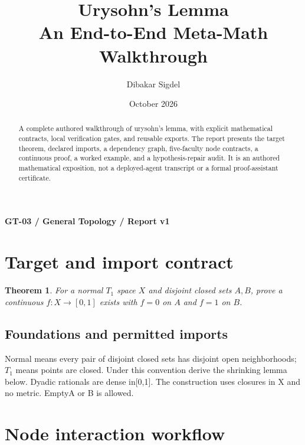 \documentclass[preprint,12pt,aps,pra,showkeys,amsmath,amssymb,superscriptaddress,floatfix]{revtex4-2}
\newtheorem{theorem}{Theorem}[section]
\theoremstyle{definition}
\theoremstyle{remark}
\begin{document}
\title{Urysohn's Lemma\\[4pt]\large An End-to-End Meta-Math Walkthrough}

\author{Dibakar Sigdel}


\date{October 2026}

\begin{abstract}

A complete authored walkthrough of urysohn's lemma, with explicit
mathematical contracts, local verification gates, and reusable exports.
The report presents the target theorem, declared imports, a dependency
graph, five-faculty node contracts, a continuous proof, a worked
example, and a hypothesis-repair audit. It is an authored mathematical
exposition, not a deployed-agent transcript or a formal proof-assistant
certificate.

\end{abstract}\maketitle\linespread{1.12}\selectfont

\noindent\textbf{GT-03 / General Topology / Report v1}

\section{Target and import contract}

\begin{theorem}

For a normal \(T_1\) space \(X\) and disjoint closed sets \(A,B\), prove
a continuous \(f:X\to[0,1]\) exists with \(f=0\) on \(A\) and \(f=1\) on
\(B\).

\end{theorem}

\subsection{Foundations and permitted imports}

Normal means every pair of disjoint closed sets has disjoint open
neighborhoods; \(T_{1}\) means points are closed. Under this convention
derive the shrinking lemma below. Dyadic rationals are dense
in{[}0,1{]}. The construction uses closures in X and no metric. EmptyA
or B is allowed.

\clearpage\section{Node interaction workflow}
\end{document}
